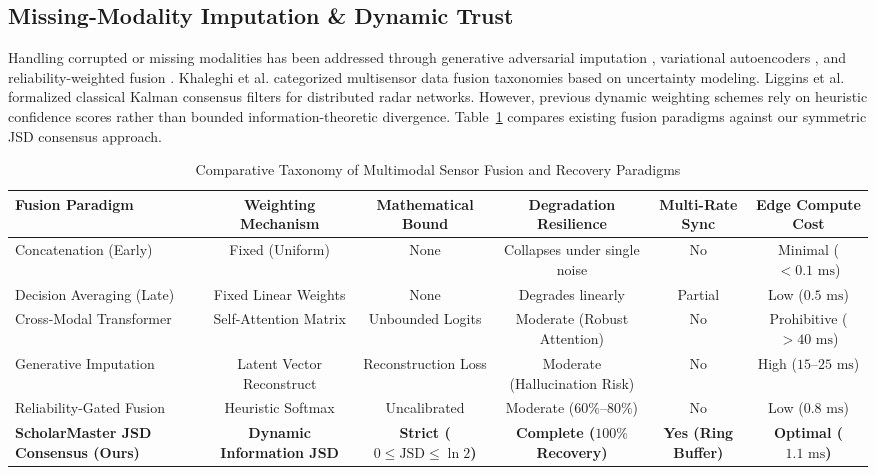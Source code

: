 \documentclass[conference]{IEEEtran}
\begin{document}
\subsection{Missing-Modality Imputation \& Dynamic Trust}
Handling corrupted or missing modalities has been addressed through generative adversarial imputation \cite{ma2021smil}, variational autoencoders \cite{lee2020private}, and reliability-weighted fusion \cite{khaleghi2013multisensor}. Khaleghi et al. \cite{khaleghi2013multisensor} categorized multisensor data fusion taxonomies based on uncertainty modeling. Liggins et al. \cite{liggins2008handbook} formalized classical Kalman consensus filters for distributed radar networks. However, previous dynamic weighting schemes rely on heuristic confidence scores rather than bounded information-theoretic divergence. Table~\ref{tab:fusion_taxonomy} compares existing fusion paradigms against our symmetric JSD consensus approach.

\begin{table}[t]
\centering
\caption{Comparative Taxonomy of Multimodal Sensor Fusion and Recovery Paradigms}
\label{tab:fusion_taxonomy}
\begin{tabular}{@{}lccccc@{}}
\toprule
\textbf{Fusion Paradigm} & \textbf{Weighting Mechanism} & \textbf{Mathematical Bound} & \textbf{Degradation Resilience} & \textbf{Multi-Rate Sync} & \textbf{Edge Compute Cost} \\ \midrule
Concatenation (Early) \cite{baltrusaitis2018multimodal} & Fixed (Uniform) & None & Collapses under single noise & No & Minimal ($<0.1\text{ ms}$) \\
Decision Averaging (Late) \cite{khaleghi2013multisensor} & Fixed Linear Weights & None & Degrades linearly & Partial & Low ($0.5\text{ ms}$) \\
Cross-Modal Transformer \cite{tsai2019multimodal} & Self-Attention Matrix & Unbounded Logits & Moderate (Robust Attention) & No & Prohibitive ($>40\text{ ms}$) \\
Generative Imputation \cite{ma2021smil} & Latent Vector Reconstruct & Reconstruction Loss & Moderate (Hallucination Risk) & No & High ($15\text{--}25\text{ ms}$) \\
Reliability-Gated Fusion \cite{khaleghi2013multisensor} & Heuristic Softmax & Uncalibrated & Moderate ($60\%\text{--}80\%$) & No & Low ($0.8\text{ ms}$) \\
\textbf{ScholarMaster JSD Consensus (Ours)} & \textbf{Dynamic Information JSD} & \textbf{Strict ($0 \le \text{JSD} \le \ln 2$)} & \textbf{Complete ($100\%$ Recovery)} & \textbf{Yes (Ring Buffer)} & \textbf{Optimal ($1.1\text{ ms}$)} \\ \bottomrule
\end{tabular}
\end{table}
\end{document}
